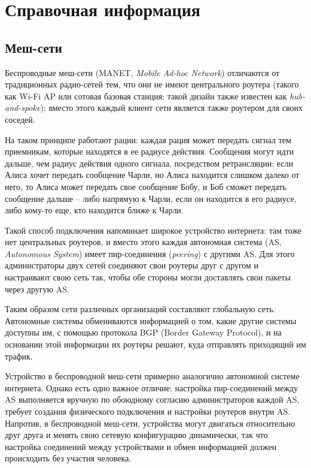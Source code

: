 \documentclass[%
]{report}
\begin{document}
\section{Справочная информация}


\subsection{Меш-сети}
Беспроводные меш-сети (MANET, \emph{Mobile Ad-hoc Network})
отличаются от традиционных радио-сетей тем,
что они не имеют центрального роутера (такого как Wi-Fi AP или сотовая базовая станция: такой дизайн также известен как \emph{hub-and-spoke});
вместо этого каждый клиент сети является также роутером для своих соседей.

На таком принципе работают рации:
каждая рация может передать сигнал тем приемникам, которые находятся в ее радиусе действия.
Сообщения могут идти дальше, чем радиус действия одного сигнала,
посредством ретрансляции:
если Алиса хочет передать сообщение Чарли,
но Алиса находится слишком далеко от него,
то Алиса может передать свое сообщение Бобу,
и Боб сможет передать сообщение дальше --
либо напрямую к Чарли, если он находится в его радиусе,
либо кому-то еще, кто находится ближе к Чарли.

Такой способ подключения напоминает широкое устройство интернета:
там тоже нет центральных роутеров,
и вместо этого каждая автономная система (AS, \emph{Autonomous System})
имеет пир-соединения (\emph{peering}) с другими AS.
Для этого администраторы двух сетей
соединяют свои роутеры друг с другом
и настраивают свою сеть так, чтобы обе стороны
могли доставлять свои пакеты через другую AS.

Таким образом сети различных организаций составляют глобальную сеть.
Автономные системы обмениваются информацией о том, какие другие системы доступны им,
с помощью протокола BGP (Border Gateway Protocol),
и на основании этой информации их роутеры решают, куда отправлять приходящий им трафик.

Устройство в беспроводной меш-сети примерно аналогично автономной системе интернета.
Однако есть одно важное отличие:
настройка пир-соединений между AS выполняется вручную
по обоюдному согласию администраторов каждой AS,
требует создания физического подключения
и настройки роутеров внутри AS.
Напротив, в беспроводной меш-сети,
устройства могут двигаться относительно друг друга и менять свою сетевую конфигурацию динамически,
так что настройка соединений между устройствами и обмен информацией
должен происходить без участия человека.
\end{document}

